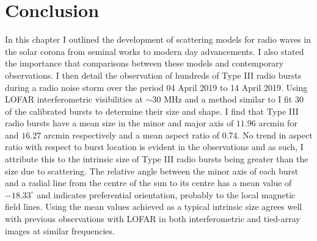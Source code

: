 \section{Conclusion}
In this chapter I outlined the development of scattering models for radio waves in the solar corona from seminal works to modern day advancements. I also stated the importance that comparisons between these models and contemporary observations. I then detail the observation of hundreds of Type III radio bursts during a radio noise storm over the period 04 April 2019 to 14 April 2019. Using LOFAR interferometric visibilities at $\sim 30$ MHz and a method similar to \cite{Murphy2021} I fit 30 of the calibrated bursts to determine their size and shape. I find that Type III radio bursts have a mean size in the minor and major axis of $11.96$ arcmin for and $16.27$ arcmin respectively and a mean aspect ratio of 0.74. No trend in aspect ratio with respect to burst location is evident in the observations and as such, I attribute this to the intrinsic size of Type III radio bursts being greater than the size due to scattering. The relative angle between the minor axis of each burst and a radial line from the centre of the sun to its centre has a mean value of $-18.33^\circ$ and indicates preferential orientation, probably to the local magnetic field lines. Using the mean values achieved as a typical intrinsic size agrees well with previous observations with LOFAR in both interferometric and tied-array images at similar frequencies.

